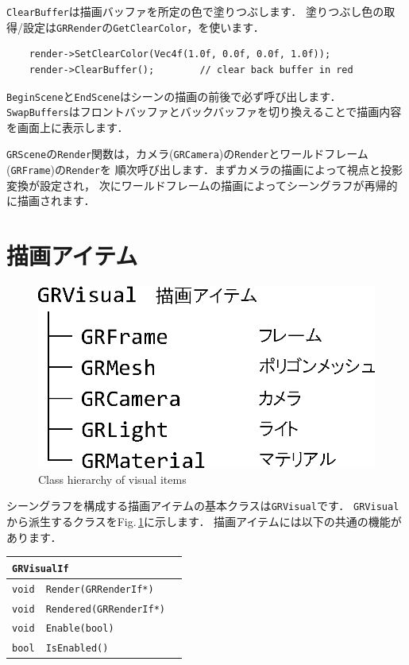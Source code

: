 \texttt{ClearBuffer}は描画バッファを所定の色で塗りつぶします．
\KLUDGE 塗りつぶし色の取得/設定は\texttt{GRRender}の\texttt{GetClearColor}，を使います．
\begin{verbatim}
    render->SetClearColor(Vec4f(1.0f, 0.0f, 0.0f, 1.0f));
    render->ClearBuffer();        // clear back buffer in red
\end{verbatim}

\texttt{BeginScene}と\texttt{EndScene}はシーンの描画の前後で必ず呼び出します．
\texttt{SwapBuffers}はフロントバッファとバックバッファを切り換えることで描画内容を画面上に表示します．

\texttt{GRScene}の\texttt{Render}関数は，カメラ(\texttt{GRCamera})の\texttt{Render}とワールドフレーム(\texttt{GRFrame})の\texttt{Render}を
\KLUDGE 順次呼び出します．まずカメラの描画によって視点と投影変換が設定され，
\KLUDGE 次にワールドフレームの描画によってシーングラフが再帰的に描画されます．

\section{描画アイテム}

\begin{figure}[t]
\begin{center}
\includegraphics[width=.4\hsize]{fig/grvisual.eps}
\end{center}
\caption{Class hierarchy of visual items}
\label{fig_grvisual}
\end{figure}

\KLUDGE シーングラフを構成する描画アイテムの基本クラスは\texttt{GRVisual}です．
\texttt{GRVisual}から派生するクラスをFig.\,\ref{fig_grvisual}に示します．
\KLUDGE 描画アイテムには以下の共通の機能があります．

\begin{center}
\begin{tabular}{p{.15\hsize}p{.45\hsize}p{.3\hsize}}
\multicolumn{3}{l}{\texttt{GRVisualIf}}					\\ \midrule
\texttt{void}	& \texttt{Render(GRRenderIf*)}		& 	\\
\texttt{void} 	& \texttt{Rendered(GRRenderIf*)}	& 	\\
\texttt{void} 	& \texttt{Enable(bool)}				& 	\\
\texttt{bool} 	& \texttt{IsEnabled()}				& 	\\
\end{tabular}
\end{center}

